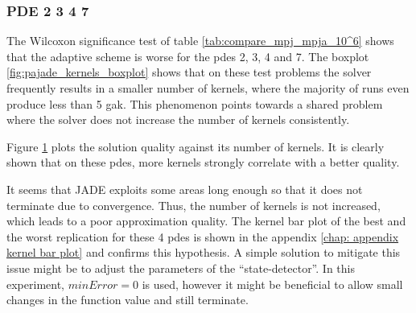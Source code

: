 \documentclass[./\jobname.tex]{subfiles}
\begin{document}
\subsubsection{PDE 2 3 4 7}
\label{chap:pde 2 3 4 7}
The Wilcoxon significance test of table \ref{tab:compare_mpj_mpja_10^6} shows that the adaptive scheme is worse for the \gls{pde}s 2, 3, 4 and 7. The boxplot \ref{fig:pajade_kernels_boxplot} shows that on these test problems the solver frequently results in a smaller number of kernels, where the majority of runs even produce less than 5 \gls{gak}. This phenomenon points towards a shared problem where the solver does not increase the number of kernels consistently. 

Figure \ref{fig:pajade_pde2347_kernels_l2norm} plots the solution quality against its number of kernels. It is clearly shown that on these \gls{pde}s, more kernels strongly correlate with a better quality. 

\begin{figure}[H]
	\centering
	\noindent{}
	\label{fig:pajade_pde2347_kernels_l2norm}
\end{figure}

It seems that JADE exploits some areas long enough so that it does not terminate due to convergence. Thus, the number of kernels is not increased, which leads to a poor approximation quality. The kernel bar plot of the best and the worst replication for these 4 \gls{pde}s is shown in the appendix \ref{chap: appendix kernel bar plot} and confirms this hypothesis. A simple solution to mitigate this issue might be to adjust the parameters of the ``state-detector''. In this experiment, $minError = 0$ is used, however it might be beneficial to allow small changes in the function value and still terminate. 
\end{document}
